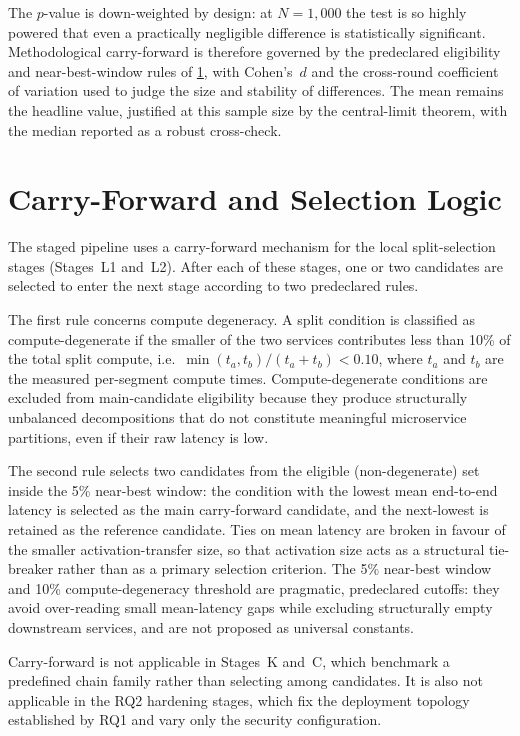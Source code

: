 The $p$-value is down-weighted by design: at $N = 1{,}000$ the test is so highly powered
that even a practically negligible difference is statistically significant. Methodological
carry-forward is therefore governed by the predeclared eligibility and near-best-window
rules of \cref{sec:methods-carryforward}, with Cohen's~$d$ and the cross-round coefficient
of variation used to judge the size and stability of differences. The mean remains the
headline value, justified at this sample size by the central-limit theorem, with the
median reported as a robust cross-check.

\section{Carry-Forward and Selection Logic}
\label{sec:methods-carryforward}

The staged pipeline uses a carry-forward mechanism for the local split-selection stages
(Stages~L1 and~L2).
After each of these stages, one or two candidates are selected to enter the next stage
according to two predeclared rules.

The first rule concerns compute degeneracy.
A split condition is classified as compute-degenerate if the smaller of the two services
contributes less than 10\% of the total split compute, i.e.\
$\min(t_a, t_b) / (t_a + t_b) < 0.10$, where $t_a$ and $t_b$ are the measured per-segment
compute times.
Compute-degenerate conditions are excluded from main-candidate eligibility because they
produce structurally unbalanced decompositions that do not constitute meaningful
microservice partitions, even if their raw latency is low.

The second rule selects two candidates from the eligible (non-degenerate) set inside the
5\% near-best window: the condition with the lowest mean end-to-end latency is selected
as the main carry-forward candidate, and the next-lowest is retained as the reference
candidate. Ties on mean latency are broken in favour of the smaller activation-transfer
size, so that activation size acts as a structural tie-breaker rather than as a primary
selection criterion.
The 5\% near-best window and 10\% compute-degeneracy threshold are pragmatic,
predeclared cutoffs: they avoid over-reading small mean-latency gaps while excluding
structurally empty downstream services, and are not proposed as universal constants.

Carry-forward is not applicable in Stages~K and~C, which benchmark a predefined chain
family rather than selecting among candidates.
It is also not applicable in the RQ2 hardening stages, which fix the deployment topology
established by RQ1 and vary only the security configuration.

